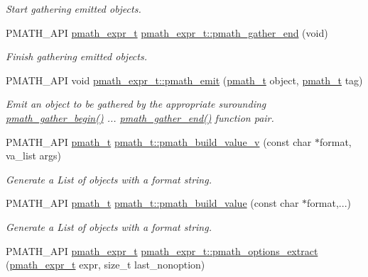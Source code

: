 \begin{CompactItemize}
\begin{CompactList}\small\item\em Start gathering emitted objects. \item\end{CompactList}\item 
PMATH\_\-API \hyperlink{classpmath__expr__t}{pmath\_\-expr\_\-t} \hyperlink{group__helpers_ga2f732b35703986263e3a15592b4a46e}{pmath\_\-expr\_\-t::pmath\_\-gather\_\-end} (void)
\begin{CompactList}\small\item\em Finish gathering emitted objects. \item\end{CompactList}\item 
PMATH\_\-API void \hyperlink{group__helpers_ga06135012f4d2a0faf696c0cd1111075}{pmath\_\-expr\_\-t::pmath\_\-emit} (\hyperlink{classpmath__t}{pmath\_\-t} object, \hyperlink{classpmath__t}{pmath\_\-t} tag)
\begin{CompactList}\small\item\em Emit an object to be gathered by the appropriate surounding \hyperlink{group__helpers_g077f3730ca4275b87d9a35bce6013e45}{pmath\_\-gather\_\-begin()} ... \hyperlink{group__helpers_ga2f732b35703986263e3a15592b4a46e}{pmath\_\-gather\_\-end()} function pair. \item\end{CompactList}\item 
PMATH\_\-API \hyperlink{classpmath__t}{pmath\_\-t} \hyperlink{group__helpers_g96660afa0732edf675653eb6ddeab0a4}{pmath\_\-t::pmath\_\-build\_\-value\_\-v} (const char $\ast$format, va\_\-list args)
\begin{CompactList}\small\item\em Generate a List of objects with a format string. \item\end{CompactList}\item 
PMATH\_\-API \hyperlink{classpmath__t}{pmath\_\-t} \hyperlink{group__helpers_g13a748aa283c5f5408cce037d3ad224d}{pmath\_\-t::pmath\_\-build\_\-value} (const char $\ast$format,...)
\begin{CompactList}\small\item\em Generate a List of objects with a format string. \item\end{CompactList}\item 
PMATH\_\-API \hyperlink{classpmath__expr__t}{pmath\_\-expr\_\-t} \hyperlink{group__helpers_g24403dfbd825b17fc4c6da5973922184}{pmath\_\-expr\_\-t::pmath\_\-options\_\-extract} (\hyperlink{classpmath__expr__t}{pmath\_\-expr\_\-t} expr, size\_\-t last\_\-nonoption)

\end{CompactItemize}
